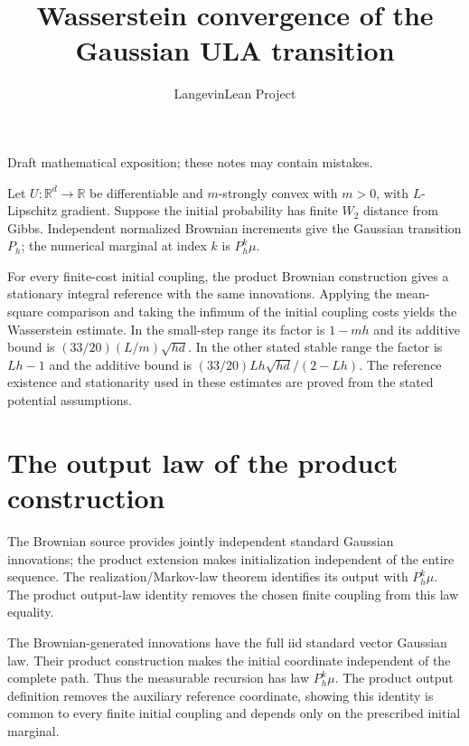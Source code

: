 \documentclass[11pt,a4paper]{article}
\title{\texorpdfstring{Wasserstein convergence of the Gaussian ULA transition}{Wasserstein convergence of the Gaussian ULA transition}}
\author{LangevinLean Project}
\date{}
\begin{document}
\maketitle
Draft mathematical exposition; these notes may contain mistakes.


Let \(U:\mathbb R^d\to\mathbb R\) be differentiable and \(m\)-strongly convex with \(m>0\), with \(L\)-Lipschitz gradient. Suppose the initial probability has finite \(W_2\) distance from Gibbs. Independent normalized Brownian increments give the Gaussian transition \(P_h\); the numerical marginal at index \(k\) is \(P_h^k\mu\).



For every finite-cost initial coupling, the product Brownian construction gives a stationary integral reference with the same innovations. Applying the mean-square comparison and taking the infimum of the initial coupling costs yields the Wasserstein estimate. In the small-step range its factor is \(1-mh\) and its additive bound is \((33/20)(L/m)\sqrt{hd}\). In the other stated stable range the factor is \(Lh-1\) and the additive bound is \((33/20)Lh\sqrt{hd}/(2-Lh)\). The reference existence and stationarity used in these estimates are proved from the stated potential assumptions.


\section{\texorpdfstring{The output law of the product construction}{The output law of the product construction}}


The Brownian source provides jointly independent standard Gaussian innovations; the product extension makes initialization independent of the entire sequence. The realization/\allowbreak{}Markov-law theorem identifies its output with \(P_h^k\mu\). The product output-law identity removes the chosen finite coupling from this law equality.



The Brownian-generated innovations have the full iid standard vector Gaussian law. Their product construction makes the initial coordinate independent of the complete path. Thus the measurable recursion has law \(P_h^k\mu\). The product output definition removes the auxiliary reference coordinate, showing this identity is common to every finite initial coupling and depends only on the prescribed initial marginal.
\end{document}
